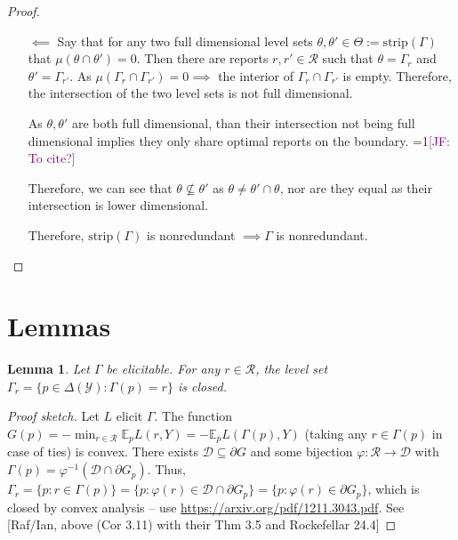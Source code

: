 \documentclass[12pt]{article}
\newcommand{\Comments}{1}
\newcommand{\mynote}[2]{\ifnum\Comments=1\textcolor{#1}{#2}\fi}
\newcommand{\jessie}[1]{\mynote{purple}{[JF: #1]}}
\newcommand{\D}{\mathcal{D}}
\newcommand{\E}{\mathbb{E}}
\newcommand{\R}{\mathcal{R}}
\newcommand{\Y}{\mathcal{Y}}
\newcommand{\strip}{\text{strip}}
\newtheorem{lemma}{Lemma}
\begin{document}
\begin{proof}
\begin{enumerate}
		
		\item[$\impliedby$] 
		Say that for any two full dimensional level sets $\theta, \theta' \in \Theta := \strip(\Gamma)$ that $\mu(\theta \cap \theta') = 0$.
		Then there are reports $r, r' \in \R$ such that $\theta = \Gamma_r$ and $\theta' = \Gamma_{r'}$.
		As $\mu(\Gamma_r \cap \Gamma_{r'}) = 0 \implies$ the interior of $\Gamma_r \cap \Gamma_{r'}$ is empty.
		Therefore, the intersection of the two level sets is not full dimensional.
		
		As $\theta, \theta'$ are both full dimensional, than their intersection not being full dimensional implies they only share optimal reports on the boundary. \jessie{To cite?}
		
		Therefore, we can see that $\theta \not \subseteq \theta'$ as $\theta \neq \theta' \cap \theta$, nor are they equal as their intersection is lower dimensional.
		
		Therefore, $\strip(\Gamma)$ is nonredundant $\implies \Gamma$ is nonredundant.
	\end{enumerate}
	
\end{proof}


\section{Lemmas}

\begin{lemma}\label{lem:closed-level-sets}
	Let $\Gamma$ be elicitable.
	For any $r\in\R$, the level set $\Gamma_r = \{ p \in \Delta(\Y) : \Gamma(p) = r \}$ is closed.
\end{lemma}
\begin{proof}[Proof sketch]
	Let $L$ elicit $\Gamma$.
	The function $G(p) = -\min_{r\in\R} \E_p L(r,Y) = -\E_p L(\Gamma(p),Y)$ (taking any $r\in\Gamma(p)$ in case of ties) is convex.
	There exists $\D \subseteq \partial G$ and some bijection $\varphi : \R \to \D$ with $\Gamma(p) = \varphi^{-1}(\D\cap \partial G_p)$.
	Thus, $\Gamma_r = \{p : r\in\Gamma(p)\} = \{p : \varphi(r) \in \D\cap\partial G_p\} = \{p : \varphi(r) \in \partial G_p\}$, which is closed by convex analysis -- use \url{https://arxiv.org/pdf/1211.3043.pdf}.
	See [Raf/Ian, above (Cor 3.11) with their Thm 3.5 and Rockefellar 24.4]  
\end{proof}
\end{document}
